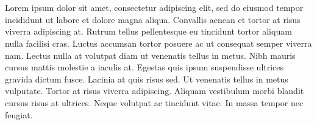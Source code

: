 \section{}
Lorem ipsum dolor sit amet, consectetur adipiscing elit, sed do eiusmod tempor incididunt ut labore et dolore magna aliqua. Convallis aenean et tortor at risus viverra adipiscing at. Rutrum tellus pellentesque eu tincidunt tortor aliquam nulla facilisi cras. Luctus accumsan tortor posuere ac ut consequat semper viverra nam. Lectus nulla at volutpat diam ut venenatis tellus in metus. Nibh mauris cursus mattis molestie a iaculis at. Egestas quis ipsum suspendisse ultrices gravida dictum fusce. Lacinia at quis risus sed. Ut venenatis tellus in metus vulputate. Tortor at risus viverra adipiscing. Aliquam vestibulum morbi blandit cursus risus at ultrices. Neque volutpat ac tincidunt vitae. In massa tempor nec feugiat.